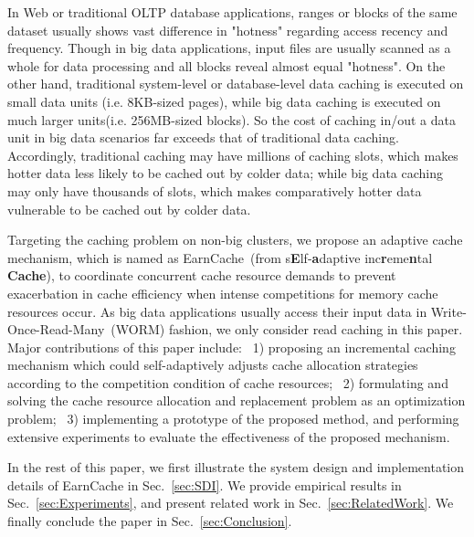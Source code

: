 
In Web or traditional OLTP database applications, ranges or blocks of the same dataset usually shows vast difference in "hotness" regarding access recency and frequency.
Though in big data applications, input files are usually scanned as a whole for data processing and all blocks reveal almost equal "hotness".
On the other hand, traditional system-level or database-level data caching is executed on small data units (i.e. 8KB-sized pages), while big data caching is executed on much larger units(i.e. 256MB-sized blocks). So the cost of caching in/out a data unit in big data scenarios far exceeds that of traditional data caching. 
Accordingly, traditional caching may have millions of caching slots, which makes hotter data less likely to be cached out by colder data; while big data caching may only have thousands of slots, which makes comparatively hotter data vulnerable to be cached out by colder data.

Targeting the caching problem on non-big clusters, we propose an adaptive cache mechanism, which is named as EarnCache~(from s\textbf{E}lf-\textbf{a}daptive inc\textbf{r}eme\textbf{n}tal \textbf{Cache}), to coordinate concurrent cache resource demands to prevent exacerbation in cache efficiency when intense competitions for memory cache resources occur. As big data applications usually access their input data in Write-Once-Read-Many~(WORM) fashion, we only consider read caching in this paper. Major contributions of this paper include: ~1) proposing an incremental caching mechanism which could self-adaptively adjusts cache allocation strategies according to the competition condition of cache resources; ~2) formulating and solving the cache resource allocation and replacement problem as an optimization problem; ~3) implementing a prototype of the proposed method, and performing extensive experiments to evaluate the effectiveness of the proposed mechanism.


In the rest of this paper, we first illustrate the system design and implementation details of EarnCache in Sec.~\ref{sec:SDI}. We provide empirical results in Sec.~\ref{sec:Experiments}, and present related work in Sec.~\ref{sec:RelatedWork}. We finally conclude the paper in Sec.~\ref{sec:Conclusion}.
